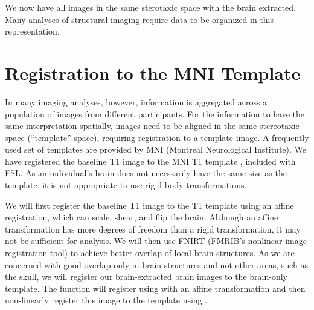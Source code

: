 We now have all images in the same sterotaxic space with the brain extracted.  Many analyses of structural imaging require data to be organized in this representation.

\section{Registration to the MNI Template}
In many imaging analyses, however, information is aggregated across a population of images from different participants.  For the information to have the same interpretation spatially, images need to be aligned in the same stereotaxic space (``template'' space), requiring registration to a template image.  A frequently used set of templates are provided by MNI (Montreal Neurological Institute). We have registered the baseline T1 image to the MNI T1 template \citep{hutchison_symmetric_2006}, included with FSL.  As an individual's brain does not necessarily have the same size as the template, it is not appropriate to use rigid-body transformations.  


We will first register the baseline T1 image to the T1 template using an affine registration, which can scale, shear, and flip the brain.  Although an affine transformation has more degrees of freedom than a rigid transformation, it may not be sufficient for analysis.  We will then use FNIRT (FMRIB's nonlinear image registration tool) to achieve better overlap of local brain structures\citep{jenkinson_fsl_2012, andersson_non-linear_2007}.  As we are concerned with good overlap only in brain structures and not other areas, such as the skull, we will register our brain-extracted brain images to the brain-only template.  The  function  will register using  with an affine transformation and then non-linearly register this image to the template using .


\gobblepars
\begin{knitrout}
\color{fgcolor}\begin{kframe}
\begin{alltt}
\hlstd{(} \hlstd{=} \hlstd{,}
                   \hlstd{=} \hlstd{(}\hlstd{(),} \hlstd{,} \hlstd{,} \hlstd{),}
                   \hlstd{=} \hlstd{,}
                   \hlstd{=} \hlstd{,}
                   \hlstd{=} \hlstd{)}
\end{alltt}
\end{kframe}
\end{knitrout}
\gobblepars

